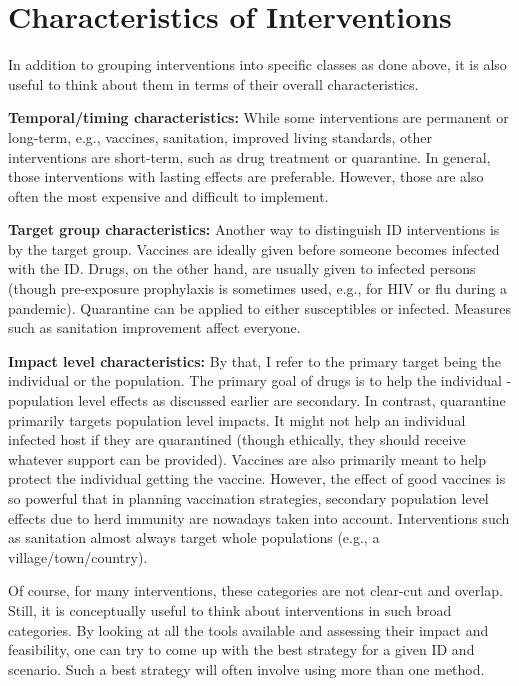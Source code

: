 \documentclass[]{book}
\theoremstyle{definition}
\theoremstyle{definition}
\theoremstyle{definition}
\theoremstyle{remark}
\begin{document}
\section{Characteristics of
Interventions}\label{characteristics-of-interventions}

In addition to grouping interventions into specific classes as done
above, it is also useful to think about them in terms of their overall
characteristics.

\textbf{Temporal/timing characteristics:} While some interventions are
permanent or long-term, e.g., vaccines, sanitation, improved living
standards, other interventions are short-term, such as drug treatment or
quarantine. In general, those interventions with lasting effects are
preferable. However, those are also often the most expensive and
difficult to implement.

\textbf{Target group characteristics:} Another way to distinguish ID
interventions is by the target group. Vaccines are ideally given before
someone becomes infected with the ID. Drugs, on the other hand, are
usually given to infected persons (though pre-exposure prophylaxis is
sometimes used, e.g., for HIV or flu during a pandemic). Quarantine can
be applied to either susceptibles or infected. Measures such as
sanitation improvement affect everyone.

\textbf{Impact level characteristics:} By that, I refer to the primary
target being the individual or the population. The primary goal of drugs
is to help the individual - population level effects as discussed
earlier are secondary. In contrast, quarantine primarily targets
population level impacts. It might not help an individual infected host
if they are quarantined (though ethically, they should receive whatever
support can be provided). Vaccines are also primarily meant to help
protect the individual getting the vaccine. However, the effect of good
vaccines is so powerful that in planning vaccination strategies,
secondary population level effects due to herd immunity are nowadays
taken into account. Interventions such as sanitation almost always
target whole populations (e.g., a village/town/country).

Of course, for many interventions, these categories are not clear-cut
and overlap. Still, it is conceptually useful to think about
interventions in such broad categories. By looking at all the tools
available and assessing their impact and feasibility, one can try to
come up with the best strategy for a given ID and scenario. Such a best
strategy will often involve using more than one method.
\end{document}
